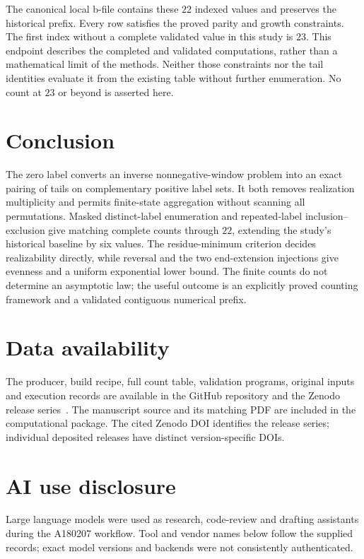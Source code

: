 \documentclass[11pt]{article}
\theoremstyle{definition}
\theoremstyle{remark}
\begin{document}
The canonical local b-file contains these $22$ indexed values and preserves
the historical prefix. Every row satisfies the proved parity and growth
constraints. The first index without a complete validated value in this
study is $23$. This endpoint describes the completed and validated
computations, rather than a mathematical limit of the methods. Neither
those constraints nor the tail identities evaluate
it from the existing table without further enumeration. No count at $23$
or beyond is asserted here.

\section{Conclusion}

The zero label converts an inverse nonnegative-window problem into an exact
pairing of tails on complementary positive label sets. It both removes
realization multiplicity and permits finite-state aggregation without scanning
all permutations. Masked distinct-label enumeration and repeated-label
inclusion--exclusion give matching complete counts through $22$, extending
the study's historical baseline by six values. The residue-minimum criterion
decides realizability directly, while reversal and the two end-extension
injections give evenness and a uniform exponential lower bound. The finite counts
do not determine an asymptotic law; the useful outcome is an explicitly
proved counting framework and a validated contiguous numerical prefix.

\section*{Data availability}

The producer, build recipe, full count table, validation programs, original
inputs and execution records are available in the GitHub repository and
the Zenodo release series~\cite{corti}. The manuscript source and its
matching PDF are included in the computational package. The cited Zenodo
DOI identifies the release series; individual deposited releases have
distinct version-specific DOIs.

\section*{AI use disclosure}

Large language models were used as research, code-review and drafting
assistants during the A180207 workflow. Tool and vendor names below follow
the supplied records; exact model versions and backends were not consistently
authenticated.
\end{document}
